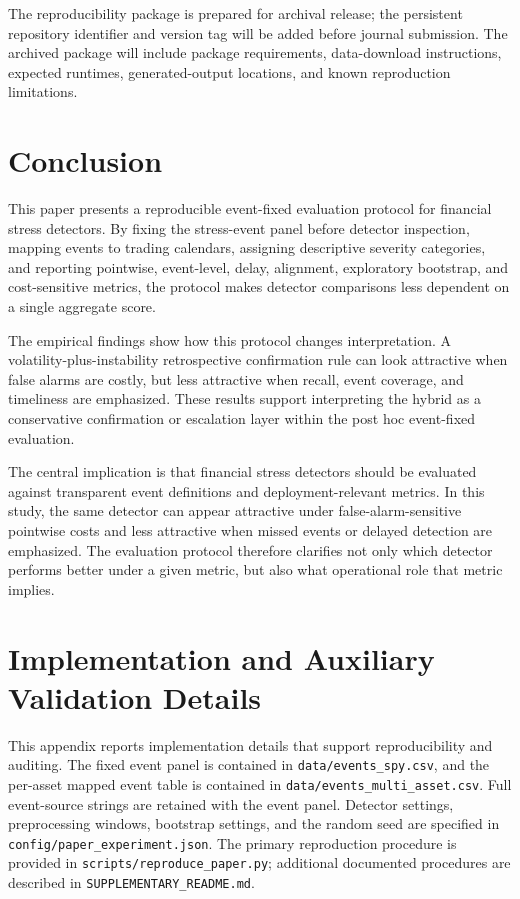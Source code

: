 \documentclass[10pt,twocolumn]{article}
\begin{document}
The reproducibility package is prepared for archival release; the persistent repository identifier and version tag will be added before journal submission. The archived package will include package requirements, data-download instructions, expected runtimes, generated-output locations, and known reproduction limitations.

\section{Conclusion}
This paper presents a reproducible event-fixed evaluation protocol for financial stress detectors. By fixing the stress-event panel before detector inspection, mapping events to trading calendars, assigning descriptive severity categories, and reporting pointwise, event-level, delay, alignment, exploratory bootstrap, and cost-sensitive metrics, the protocol makes detector comparisons less dependent on a single aggregate score.

The empirical findings show how this protocol changes interpretation. A volatility-plus-instability retrospective confirmation rule can look attractive when false alarms are costly, but less attractive when recall, event coverage, and timeliness are emphasized. These results support interpreting the hybrid as a conservative confirmation or escalation layer within the post hoc event-fixed evaluation.

The central implication is that financial stress detectors should be evaluated against transparent event definitions and deployment-relevant metrics. In this study, the same detector can appear attractive under false-alarm-sensitive pointwise costs and less attractive when missed events or delayed detection are emphasized. The evaluation protocol therefore clarifies not only which detector performs better under a given metric, but also what operational role that metric implies.

\appendix
\section{Implementation and Auxiliary Validation Details}
\label{app:implementation_details}
This appendix reports implementation details that support reproducibility and auditing. The fixed event panel is contained in \texttt{data/events\_spy.csv}, and the per-asset mapped event table is contained in \texttt{data/events\_multi\_asset.csv}. Full event-source strings are retained with the event panel. Detector settings, preprocessing windows, bootstrap settings, and the random seed are specified in \texttt{config/paper\_experiment.json}. The primary reproduction procedure is provided in \texttt{scripts/reproduce\_paper.py}; additional documented procedures are described in \texttt{SUPPLEMENTARY\_README.md}.
\end{document}
